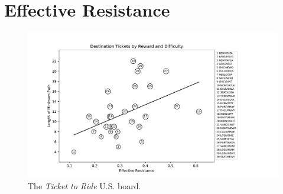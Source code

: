 \section{Effective Resistance}

\begin{figure}[ht]
\centering
\includegraphics[scale=.2]{figures/resistance}
\caption{The \textit{Ticket to Ride} U.S. board.}
\label{fig:resistance}
\end{figure}